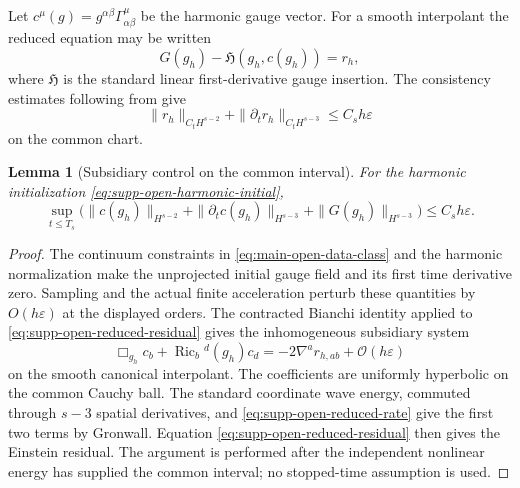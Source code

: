 \documentclass[11pt]{article}
\newtheorem{lemma}[lemma]{Lemma}
\theoremstyle{definition}
\theoremstyle{remark}
\begin{document}
Let $c^\mu(g)=g^{\alpha\beta}\Gamma^\mu_{\alpha\beta}$ be the harmonic gauge
vector.  For a smooth interpolant the reduced equation may be written
\begin{equation}
 G(g_h)-\mathfrak H(g_h,c(g_h))=r_h,
 \label{eq:supp-open-reduced-residual}
\end{equation}
where $\mathfrak H$ is the standard linear first-derivative gauge insertion.
The consistency estimates following from
 give
\begin{equation}
 \|r_h\|_{C_tH^{s-2}}+
 \|\partial_tr_h\|_{C_tH^{s-3}}
 \le C_sh\varepsilon
 \label{eq:supp-open-reduced-rate}
\end{equation}
on the common chart.

\begin{lemma}[Subsidiary control on the common interval]
\label{lem:supp-open-subsidiary}
For the harmonic initialization \eqref{eq:supp-open-harmonic-initial},
\begin{equation}
 \sup_{t\le T_s}\bigl(
 \|c(g_h)\|_{H^{s-2}}+\|\partial_tc(g_h)\|_{H^{s-3}}
 +\|G(g_h)\|_{H^{s-3}}\bigr)\le C_sh\varepsilon.
 \label{eq:supp-open-subsidiary}
\end{equation}
\end{lemma}
\begin{proof}
The continuum constraints in \eqref{eq:main-open-data-class} and the harmonic
normalization make the unprojected initial gauge field and its first time
derivative zero.  Sampling and the actual finite acceleration perturb these
quantities by $O(h\varepsilon)$ at the displayed orders.  The contracted
Bianchi identity applied to \eqref{eq:supp-open-reduced-residual} gives the
inhomogeneous subsidiary system
\[
 \Box_{g_h}c_b+\operatorname{Ric}_b{}^d(g_h)c_d
       =-2\nabla^ar_{h,ab}+\mathcal O(h\varepsilon)
\]
on the smooth canonical interpolant.  The coefficients are uniformly
hyperbolic on the common Cauchy ball.  The standard coordinate wave energy,
commuted through $s-3$ spatial derivatives, and
\eqref{eq:supp-open-reduced-rate} give the first two terms by Gronwall.
Equation \eqref{eq:supp-open-reduced-residual} then gives the Einstein
residual.  The argument is performed after the independent nonlinear energy
has supplied the common interval; no stopped-time assumption is used.
\end{proof}
\end{document}
